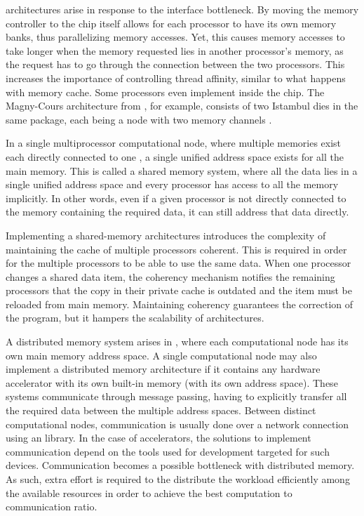\documentclass[../thesis]{subfiles}
\begin{document}
		\numa architectures arise in response to the interface bottleneck. By moving the memory controller to the \cpu chip itself allows for each processor to have its own memory banks, thus parallelizing memory accesses. Yet, this causes memory accesses to take longer when the memory requested lies in another processor's memory, as the request has to go through the connection between the two processors. This increases the importance of controlling thread affinity, similar to what happens with memory cache. Some processors even implement \numa inside the chip. The Magny-Cours architecture from \amd, for example, consists of two Istambul dies in the same package, each being a \numa node with two memory channels \cite{AMD:MagnyCours}.

		In a single multiprocessor computational node, where multiple memories exist each directly connected to one \cpu, a single unified address space exists for all the main memory. This is called a shared memory system, where all the data lies in a single unified address space and every processor has access to all the memory implicitly. In other words, even if a given processor is not directly connected to the memory containing the required data, it can still address that data directly.

		Implementing a shared-memory \numa architectures introduces the complexity of maintaining the cache of multiple processors coherent. This is required in order for the multiple processors to be able to use the same data. When one processor changes a shared data item, the coherency mechanism notifies the remaining processors that the copy in their private cache is outdated and the item must be reloaded from main memory. Maintaining coherency guarantees the correction of the program, but it hampers the scalability of \numa architectures.

		A distributed memory system arises in \hetplats, where each computational node has its own main memory address space. A single computational node may also implement a distributed memory architecture if it contains any hardware accelerator with its own built-in memory (with its own address space). These systems communicate through message passing, having to explicitly transfer all the required data between the multiple address spaces. Between distinct computational nodes, communication is usually done over a network connection using an \mpi library. In the case of accelerators, the solutions to implement communication depend on the tools used for development targeted for such devices. Communication becomes a possible bottleneck with distributed memory. As such, extra effort is required to the distribute the workload efficiently among the available resources in order to achieve the best computation to communication ratio.
\end{document}
